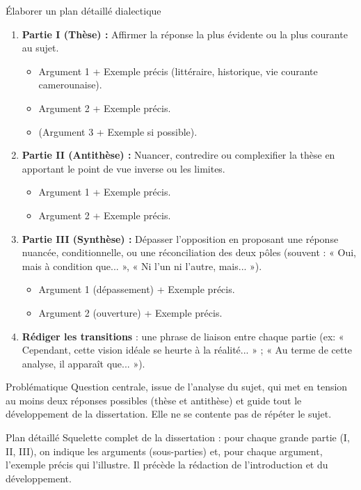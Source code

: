 \documentclass[11pt]{article}
\begin{document}
\begin{methode}{Élaborer un plan détaillé dialectique}
\begin{enumerate}
\item \textbf{Partie I (Thèse) :} Affirmer la réponse la plus évidente ou la plus courante au sujet.
  \begin{itemize}
  \item Argument 1 + Exemple précis (littéraire, historique, vie courante camerounaise).
  \item Argument 2 + Exemple précis.
  \item (Argument 3 + Exemple si possible).
  \end{itemize}
\item \textbf{Partie II (Antithèse) :} Nuancer, contredire ou complexifier la thèse en apportant le point de vue inverse ou les limites.
  \begin{itemize}
  \item Argument 1 + Exemple précis.
  \item Argument 2 + Exemple précis.
  \end{itemize}
\item \textbf{Partie III (Synthèse) :} Dépasser l'opposition en proposant une réponse nuancée, conditionnelle, ou une réconciliation des deux pôles (souvent : « Oui, mais à condition que... », « Ni l'un ni l'autre, mais... »).
  \begin{itemize}
  \item Argument 1 (dépassement) + Exemple précis.
  \item Argument 2 (ouverture) + Exemple précis.
  \end{itemize}
\item \textbf{Rédiger les transitions} : une phrase de liaison entre chaque partie (ex: « Cependant, cette vision idéale se heurte à la réalité... » ; « Au terme de cette analyse, il apparaît que... »).
\end{enumerate}
\end{methode}

\begin{definition}{Problématique}
Question centrale, issue de l'analyse du sujet, qui met en tension au moins deux réponses possibles (thèse et antithèse) et guide tout le développement de la dissertation. Elle ne se contente pas de répéter le sujet.
\end{definition}

\begin{definition}{Plan détaillé}
Squelette complet de la dissertation : pour chaque grande partie (I, II, III), on indique les arguments (sous-parties) et, pour chaque argument, l'exemple précis qui l'illustre. Il précède la rédaction de l'introduction et du développement.
\end{definition}
\end{document}
